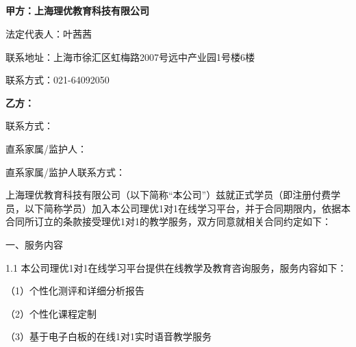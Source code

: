 \documentclass {ctexart}
\newcommand{\sanhao}{\fontsize{18pt}{\baselineskip}\selectfont} %
\begin{document}
\setlength{\parskip}{0.7ex plus0.3ex minus0.3ex} %

\setcounter{page}{1} %
\headheight 14pt %


\pagestyle{fancy}

\fancyhf{}
\renewcommand{\headrulewidth}{0pt}
\fancyhead[LE,RO]{ \usebox{\headpic}   }      %

\subsection{}

\begin{center}
\textbf{\sanhao{学员合同} }
\end{center}
\textbf{甲方：上海理优教育科技有限公司}

法定代表人：叶茜茜

联系地址：上海市徐汇区虹梅路2007号远中产业园1号楼6楼

联系方式：021-64092050

\textbf{ 乙方：}

联系方式： 

直系家属/监护人： 

直系家属/监护人联系方式：


上海理优教育科技有限公司（以下简称“本公司”）兹就正式学员（即注册付费学员，以下简称学员）加入本公司理优1对1在线学习平台，并于合同期限内，依据本合同所订立的条款接受理优1对1的教学服务，双方同意就相关合同约定如下：

一、服务内容

1.1	本公司理优1对1在线学习平台提供在线教学及教育咨询服务，服务内容如下：

（1）个性化测评和详细分析报告	

（2）个性化课程定制

（3）基于电子白板的在线1对1实时语音教学服务	
\end{document}
